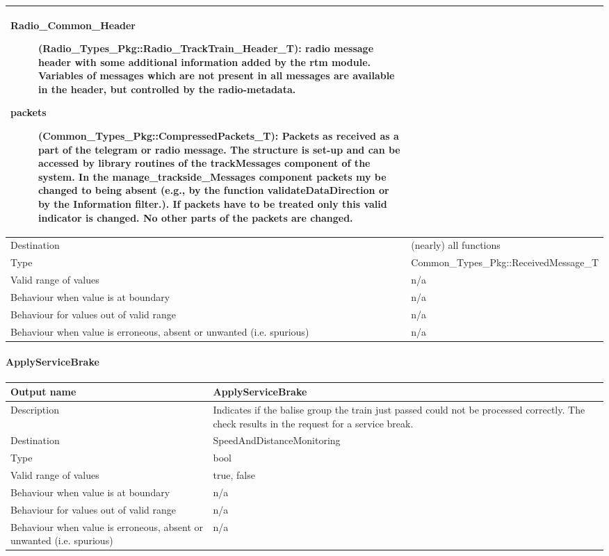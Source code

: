 \begin{longtable}{p{}p{}}
\begin{description}
\item[Radio\_Common\_Header](Radio\_Types\_Pkg::Radio\_TrackTrain\_Header\_T): radio message header with some additional information added by the rtm module. Variables of messages which are not present in all messages are available in the header, but controlled by the radio-metadata.
\item[packets](Common\_Types\_Pkg::CompressedPackets\_T): Packets as received as a part of the telegram or radio message. The structure is set-up and can be accessed by library routines of the trackMessages component of the system. In the manage\_trackside\_Messages component packets my be changed to being absent (e.g., by the function validateDataDirection or by the Information filter.). If packets have to be treated only this valid indicator is changed. No other parts of the packets are changed.

\end{description}
\\
\midrule
Destination				& (nearly) all functions \\ 
\midrule
Type					& Common\_Types\_Pkg::ReceivedMessage\_T \\
\midrule
Valid range of values	& n/a\\
\midrule
Behaviour when value is at boundary	& n/a\\
\midrule
Behaviour for values out of valid range	& n/a\\
\midrule
Behaviour when value is erroneous, absent or unwanted (i.e. spurious) & n/a\\
\bottomrule
\end{longtable}


\paragraph{ApplyServiceBrake}

\begin{longtable}{p{}p{}}
\toprule
Output name				& ApplyServiceBrake \\
\midrule
Description				&  Indicates if the balise group the train just passed could not be processed correctly. The check results in the request for a service break. \\
\midrule
Destination				& SpeedAndDistanceMonitoring\\ 
\midrule
Type					& bool \\
\midrule
Valid range of values	& true, false\\
\midrule
Behaviour when value is at boundary	& n/a\\
\midrule
Behaviour for values out of valid range	& n/a\\
\midrule
Behaviour when value is erroneous, absent or unwanted (i.e. spurious) & n/a\\
\bottomrule
\end{longtable}


